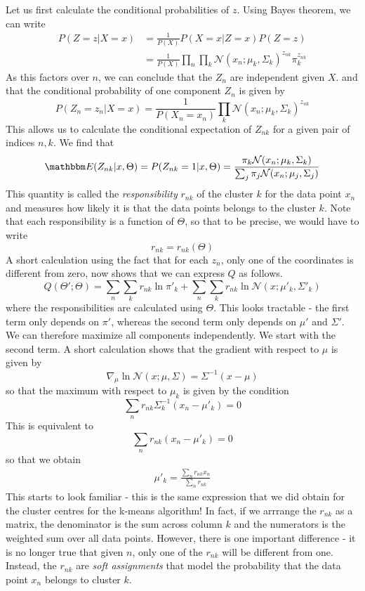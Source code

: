 \documentclass[a4paper, draft]{article}
\theoremstyle{own}
\theoremstyle{remark}
\begin{document}
Let us first calculate the conditional probabilities of $z$. Using Bayes theorem, we can write
\begin{align*}
P(Z = z | X = x) &= \frac{1}{P(X)} P(X=x | Z=x) P(Z = z)    \\
&= \frac{1}{P(X)} \prod_n \prod_k {\mathcal N}(x_n ; \mu_k, \Sigma_k)^{z_{nk}} \pi_k^{z_{nk}}
\end{align*}
As this factors over $n$, we can conclude that the $Z_n$ are independent given $X$. and that the conditional probability of one component $Z_n$ is given by
$$
P(Z_n = z_n | X = x) = \frac{1}{P(X_n = x_n)} \prod_k {\mathcal N}(x_n ; \mu_k, \Sigma_k)^{z_{nk}}
$$
This allows us to calculate the conditional expectation of $Z_{nk}$ for a given pair of indices $n,k$. We find that
\begin{align*}
{\mathbbm E}(Z_{nk} | x,\Theta ) = P(Z_{nk} = 1 | x, \Theta) = \frac{\pi_k {\mathcal N}(x_n ; \mu_k, \Sigma_k)}
{\sum_{j} \pi_j {\mathcal N}(x_n ; \mu_j, \Sigma_j) }
\end{align*}
This quantity is called the {\em responsibility} $r_{nk}$ of the cluster $k$ for the data point $x_n$ and measures how likely it is that the data points belongs to the cluster $k$. Note that each responsibility is a function of $\Theta$, so that to be precise, we would have to write
$$
r_{nk} = r_{nk}(\Theta)
$$
A short calculation using the fact that for each $z_n$, only one of the coordinates is different from zero, now shows that we can express $Q$ as follows.
$$
Q(\Theta'; \Theta) = \sum_n
\sum_k r_{nk} \ln \pi'_k 
+ \sum_n \sum_k r_{nk} \ln {\mathcal N}(x ; \mu'_k, \Sigma'_k)
$$
where the responsibilities are calculated using $\Theta$. This looks tractable - the first term  only depends on $\pi'$, whereas the second term only depends on $\mu'$ and $\Sigma'$. We can therefore maximize all components independently. We start with the second term. A short calculation shows that the gradient with respect to $\mu$ is given by
$$
\nabla_\mu \ln {\mathcal N}(x; \mu , \Sigma) = \Sigma^{-1}(x-\mu)
$$
so that the maximum with respect to $\mu_k$ is given by the condition
$$
\sum_n r_{nk} \Sigma_k^{-1} (x_n - \mu'_k) = 0
$$
This is equivalent to
$$
\sum_n r_{nk} (x_n - \mu'_k) = 0
$$
so that we obtain 
\begin{align}\label{eq:maxlikelihoodmixturecentres}
\mu'_k = \frac{\sum_n r_{nk} x_n}{\sum_n r_{nk}}
\end{align}
This starts to look familiar - this is the same expression that we did obtain for the cluster centres for the k-means algorithm! In fact, if we arrrange the $r_{nk}$ as a matrix, the denominator is the sum across column $k$ and the numerators is the weighted sum over all data points. However, there is one important difference - it is no longer true that given $n$, only one of the $r_{nk}$ will be different from one. Instead, the $r_{nk}$ are {\em soft assignments} that model the probability that the data point $x_n$ belongs to cluster $k$. 
\end{document}
